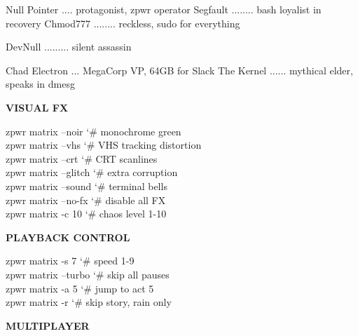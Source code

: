 \documentclass[11pt,a4paper,twoside]{book}
\begin{document}
Null Pointer .... protagonist, zpwr operator Segfault ........ bash loyalist in recovery Chmod777 ........ reckless, sudo for everything

\begin{codebox}
\color{neongreen}DevNull ......... silent assassin\\
\end{codebox}

Chad Electron ... MegaCorp VP, 64GB for Slack The Kernel ...... mythical elder, speaks in dmesg


\vspace{12pt}
{\bfseries\color{neonyellow} \textbf{VISUAL} FX}\vspace{4pt}

\begin{codebox}
\color{neongreen}zpwr matrix --noir         {\char`\#} monochrome green\\
\color{neongreen}zpwr matrix --vhs          {\char`\#} VHS tracking distortion\\
\color{neongreen}zpwr matrix --crt          {\char`\#} CRT scanlines\\
\color{neongreen}zpwr matrix --glitch       {\char`\#} extra corruption\\
\color{neongreen}zpwr matrix --sound        {\char`\#} terminal bells\\
\color{neongreen}zpwr matrix --no-fx        {\char`\#} disable all FX\\
\color{neongreen}zpwr matrix -c 10          {\char`\#} chaos level 1-10\\
\end{codebox}


\vspace{12pt}
{\bfseries\color{neonyellow} PLAYBACK CONTROL}\vspace{4pt}

\begin{codebox}
\color{neongreen}zpwr matrix -s 7           {\char`\#} speed 1-9\\
\color{neongreen}zpwr matrix --turbo        {\char`\#} skip all pauses\\
\color{neongreen}zpwr matrix -a 5           {\char`\#} jump to act 5\\
\color{neongreen}zpwr matrix -r             {\char`\#} skip story, rain only\\
\end{codebox}


\vspace{12pt}
{\bfseries\color{neonyellow} MULTIPLAYER}\vspace{4pt}
\end{document}
